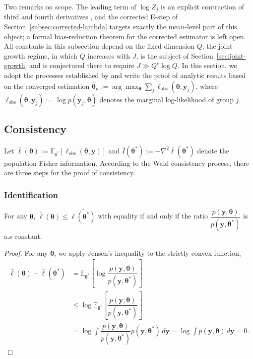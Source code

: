 Two remarks on scope. The leading term of $\log Z_{j}$ is an explicit contraction of third and fourth derivatives \citep{ShunMcCullagh1995}, and the corrected E-step of Section~\ref{subsec:corrected-lambda} targets exactly the mean-level part of this object; a formal bias-reduction theorem for the corrected estimator is left open. All constants in this subsection depend on the fixed dimension $Q$; the joint growth regime, in which $Q$ increases with $J$, is the subject of Section~\ref{sec:joint-growth} and is conjectured there to require $J\gg Q^{c}\log Q$.
\fi
\iffalse
In this section, we adopt the processes established by \citet{Cui2026} and write the proof of analytic results based on the converged estimation $\hat{\bm{\theta}}_{n}:=\arg\max_{\bm{\theta}}\sum_{j}\ell_{\text{obs}}(\bm{\theta}, \bm{y}_{j})$, where $\ell_{\text{obs}}(\bm{\theta}, \bm{y}_{j}):=\log p(\bm{y}_{j}, \bm{\theta})$ denotes the marginal log-likelihood of group $j$.

\subsection{Consistency}

Let $\bar{\ell}(\bm{\theta}):=\mathbb{E}_{\theta^{*}}[\ell_{\text{obs}}(\bm{\theta},\bm{y})]$ and $\bar{I}(\bm{\theta}^{*}):=-\nabla^{2}\bar{\ell}(\bm{\theta}^{*})$ denote the population Fisher information. According to the Wald consistency process, there are three steps for the proof of consistency.

\subsubsection{Identification}

\begin{lemma}
    For any $\bm{\theta}$, $\bar{\ell}(\bm{\theta})\leq \bar{\ell(\bm{\theta^{*}})}$ with equality if and only if the ratio $\dfrac{p(\bm{y},\bm{\theta})}{p(\bm{y},\bm{\theta}^{*})}$ is a.s  constant.
    \label{lem:identification1}
\end{lemma}

\begin{proof}
    For any $\bm{\theta}$, we apply Jensen's inequality to the strictly convex function,
    \begin{align*}
        \bar{\ell}(\bm{\theta})-\bar{\ell}(\bm{\theta}^{*})&=\mathbb{E}_{\bm{\theta}^{*}}\left[\log \dfrac{p(\bm{y},\bm{\theta})}{p(\bm{y},\bm{\theta}^{*})}\right]\\
        &\leq \log \mathbb{E}_{\bm{\theta}^{*}}\left[ \dfrac{p(\bm{y},\bm{\theta})}{p(\bm{y},\bm{\theta}^{*})}\right]\\
        &=\log \int \dfrac{p(\bm{y},\bm{\theta})}{p(\bm{y},\bm{\theta}^{*})}p(\bm{y},\bm{\theta}^{*})\,d\bm{y}=\log \int p(\bm{y},\bm{\theta})\,d\bm{y}=0.
    \end{align*}
\end{proof}

